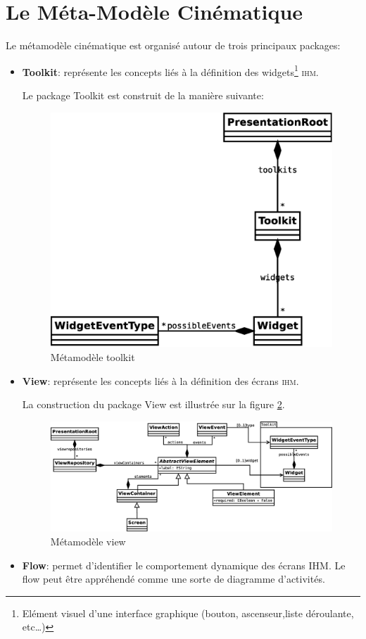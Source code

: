 \section{Le Méta-Modèle Cinématique}
Le métamodèle cinématique est organisé autour de trois principaux packages:
\begin{itemize}
  \item \textbf{Toolkit}: représente les concepts liés à la définition des widgets\footnote{Elément visuel d'une interface graphique (bouton, ascenseur,liste déroulante, etc\dots)} \textsc{ihm}.

Le package Toolkit est construit de la manière suivante:

\begin{figure}[htb]
  \centering
  \includegraphics[scale=.3]{img/toolkit.eps}
  \caption{Métamodèle toolkit}
  \label{fig:toolkit}
\end{figure}
\item \textbf{View}: représente les concepts liés à la définition des écrans \textsc{ihm}.

La construction du package View est illustrée sur la figure \ref{fig:view}.
\begin{figure}[H]
  \centering
  \includegraphics[scale=.3]{img/view.eps}
  \caption{Métamodèle view}
  \label{fig:view}
\end{figure}
  \item \textbf{Flow}: permet d'identifier le comportement dynamique des écrans \textsc{IHM}. Le flow peut être appréhendé comme une sorte de diagramme d'activités.


\end{itemize}
